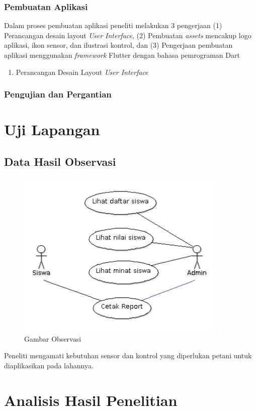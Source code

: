 \begin{flushleft}
\begin{justify}
        \subsubsection{Pembuatan Aplikasi}
        Dalam proses pembuatan aplikasi peneliti melakukan 3 pengerjaan (1) Perancangan desain layout \textit{User Interface}, (2) Pembuatan \textit{assets} mencakup logo aplikasi, ikon sensor, dan ilustrasi kontrol, dan (3) Pengerjaan pembuatan aplikasi menggunakan \textit{framework} Flutter dengan bahasa pemrograman Dart
        \begin{enumerate}
            \item Perancangan Desain Layout \textit{User Interface}
        \end{enumerate}
        \subsubsection{Pengujian dan Pergantian}


        \section{Uji Lapangan}

    \end{justify}




    
    \subsection{Data Hasil Observasi}
\vspace{5cm}
\begin{figure}[ht]
	\centering
	\includegraphics[width=10cm]{images/UseCaseDiagramSistemSaatIni}
	\caption{Gambar Observasi}
\end{figure}
Peneliti mengamati kebutuhan sensor dan kontrol yang diperlukan petani untuk diaplikasikan pada lahannya. 
    \section{Analisis Hasil Penelitian}

\end{flushleft}

\newpage